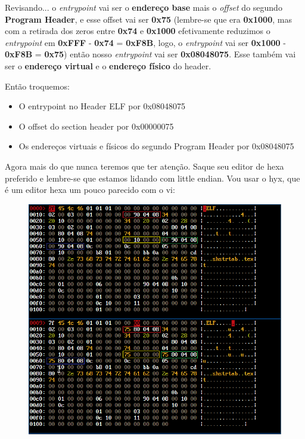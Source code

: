 \documentclass[12pt]{article}
\begin{document}
Revisando... o \emph{entrypoint} vai ser o \textbf{endereço base} mais o \emph{offset} do segundo \textbf{Program Header}, e esse offset vai ser \textbf{0x75} (lembre-se que era \textbf{0x1000}, mas com a retirada dos zeros entre \textbf{0x74} e \textbf{0x1000} efetivamente reduzimos o \emph{entrypoint} em \textbf{0xFFF} - \textbf{0x74} = \textbf{0xF8B},  logo, o \emph{entrypoint} vai ser \textbf{0x1000} - \textbf{0xF8B} = \textbf{0x75}) então nosso \emph{entrypoint} vai ser \textbf{0x08048075}. Esse também vai ser o \textbf{endereço virtual} e o \textbf{endereço físico} do header.

Então troquemos:
\begin{itemize}
	\item O entrypoint no Header ELF por 0x08048075
    \item O offset do section header por 0x00000075
    \item Os endereços virtuais e físicos do segundo Program Header por 0x08048075
\end{itemize}
 Agora mais do que nunca teremos que ter atenção. Saque seu editor de hexa preferido e lembre-se que estamos lidando com little endian. Vou usar o hyx, que é um editor hexa um pouco parecido com o vi:


\begin{figure}[H]
	\centering
\includegraphics[scale = 1.00]{img1.png}
	\centering
\end{figure}
\end{document}
